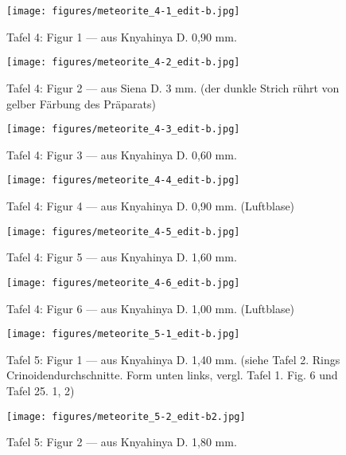 \documentclass[a4paper, 12pt, oneside]{article}
\begin{document}
\clearpage
{}
\begin{figure}[t]
\texttt{[image: figures/meteorite\_4-1\_edit-b.jpg]}
\caption{Tafel 4: Figur 1 --- aus Knyahinya D. 0,90 mm.}
\centering
\end{figure}
\clearpage
\begin{figure}[t]
\texttt{[image: figures/meteorite\_4-2\_edit-b.jpg]}
\caption{Tafel 4: Figur 2 --- aus Siena D. 3 mm. (der dunkle Strich rührt von gelber Färbung des Präparats)}
\centering
\end{figure}
\clearpage
\begin{figure}[t]
\texttt{[image: figures/meteorite\_4-3\_edit-b.jpg]}
\caption{Tafel 4: Figur 3 --- aus Knyahinya D. 0,60 mm.}
\centering
\end{figure}
\clearpage
\begin{figure}[t]
\texttt{[image: figures/meteorite\_4-4\_edit-b.jpg]}
\caption{Tafel 4: Figur 4 --- aus Knyahinya D. 0,90 mm. (Luftblase)}
\centering
\end{figure}
\clearpage
\begin{figure}[t]
\texttt{[image: figures/meteorite\_4-5\_edit-b.jpg]}
\caption{Tafel 4: Figur 5 --- aus Knyahinya D. 1,60 mm.}
\centering
\end{figure}
\clearpage
\begin{figure}[t]
\texttt{[image: figures/meteorite\_4-6\_edit-b.jpg]}
\caption{Tafel 4: Figur 6 --- aus Knyahinya D. 1,00 mm. (Luftblase)}
\centering
\end{figure}
\clearpage
{}
\begin{figure}[t]
\texttt{[image: figures/meteorite\_5-1\_edit-b.jpg]}
\caption{Tafel 5: Figur 1 --- aus Knyahinya D. 1,40 mm. (siehe Tafel 2. Rings Crinoidendurchschnitte. Form unten links, vergl. Tafel 1. Fig. 6 und Tafel 25. 1, 2)}
\centering
\end{figure}
\clearpage
\begin{figure}[t]
\texttt{[image: figures/meteorite\_5-2\_edit-b2.jpg]}
\caption{Tafel 5: Figur 2 --- aus Knyahinya D. 1,80 mm.}
\centering
\end{figure}
\clearpage
\end{document}
